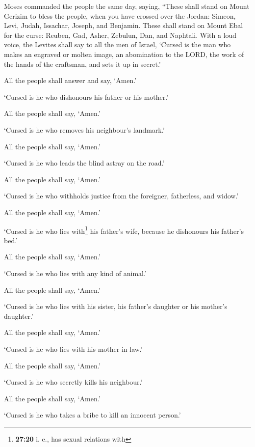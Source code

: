  Moses commanded the people the same day, saying,
 ``These shall stand on Mount Gerizim to bless the
people, when you have crossed over the Jordan: Simeon, Levi, Judah,
Issachar, Joseph, and Benjamin.  These shall stand on
Mount Ebal for the curse: Reuben, Gad, Asher, Zebulun, Dan, and
Naphtali.  With a loud voice, the Levites shall say to
all the men of Israel,  `Cursed is the man who makes an
engraved or molten image, an abomination to the LORD, the work of the
hands of the craftsman, and sets it up in secret.'

All the people shall answer and say, `Amen.'

 `Cursed is he who dishonours his father or his mother.'

All the people shall say, `Amen.'

 `Cursed is he who removes his neighbour's landmark.'

All the people shall say, `Amen.'

 `Cursed is he who leads the blind astray on the road.'

All the people shall say, `Amen.'

 `Cursed is he who withholds justice from the foreigner,
fatherless, and widow.'

All the people shall say, `Amen.'

 `Cursed is he who lies with\footnote{\textbf{27:20} i.
  e., has sexual relations with} his father's wife, because he
dishonours his father's bed.'

All the people shall say, `Amen.'

 `Cursed is he who lies with any kind of animal.'

All the people shall say, `Amen.'

 `Cursed is he who lies with his sister, his father's
daughter or his mother's daughter.'

All the people shall say, `Amen.'

 `Cursed is he who lies with his mother-in-law.'

All the people shall say, `Amen.'

 `Cursed is he who secretly kills his neighbour.'

All the people shall say, `Amen.'

 `Cursed is he who takes a bribe to kill an innocent
person.'

